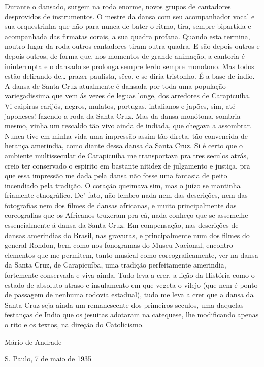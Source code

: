Durante o dansado, surgem na roda enorme, novos grupos de cantadores
desprovidos de instrumentos. O mestre da dansa com seu acompanhador
vocal e sua orquestrinha que não para nunca de bater o ritmo, tira,
sempre bipartida e acompanhada das firmatas corais, a sua quadra
profana. Quando esta termina, noutro lugar da roda outros cantadores
tiram outra quadra. E são depois outros e depois outros, de forma que,
nos momentos de grande animação, a cantoria é ininterrupta e o dansado
se prolonga sempre lerdo sempre monotono. Mas todos estão delirando
de\ldots{} prazer paulista, sêco, e se diria tristonho. É a base de indio. A
dansa de Santa Cruz atualmente é dansada por toda uma população
variegadissima que vem ás vezes de leguas longe, dos arredores de
Carapicuíba. Vi caipiras carijós, negros, mulatos, portugas, intalianos
e japões, sim, até japoneses! fazendo a roda da Santa Cruz. Mas da dansa
monótona, sombria mesmo, vinha um rescaldo tão vivo ainda de indiada,
que chegava a assombrar. Nunca tive em minha vida uma impressão assim
tão direta, tão convencida de herança amerindia, como diante dessa dansa
da Santa Cruz. Si é certo que o ambiente multissecular de Carapicuíba me
transportava pra tres seculos atrás, creio ter conservado o espirito em
bastante nitidez de julgamento e justiça, pra que essa impressão me dada
pela dansa não fosse uma fantasia de peito incendiado pela tradição. O
coração queimava sim, mas o juízo se mantinha friamente etnográfico.
De"-fato, não lembro nada nem das descrições, nem das fotografias nem dos
filmes de dansas africanas, e muito principalmente das coreografias que
os Africanos truxeram pra cá, nada conheço que se assemelhe
essencialmente á dansa da Santa Cruz. Em compensação, nas descrições de
dansas amerindias do Brasil, nas gravuras, e principalmente num dos
filmes do general Rondon, bem como nos fonogramas do Museu Nacional,
encontro elementos que me permitem, tanto musical como
coreograficamente, ver na dansa da Santa Cruz, de Carapicuíba, uma
tradição perfeitamente amerindia, fortemente conservada e viva ainda.
Tudo leva a crer, a lição da História como o estado de absoluto atraso e
insulamento em que vegeta o vilejo (que nem é ponto de passagem de
nenhuma rodovia estadual), tudo me leva a crer que a dansa da Santa Cruz
seja ainda um remanescente dos primeiros seculos, uma daquelas festanças
de Indio que os jesuitas adotaram na catequese, lhe modificando apenas o
rito e os textos, na direção do Catolicismo.

\begin{flushright}
\vfill
Mário de Andrade

S. Paulo, 7 de maio de 1935
\end{flushright}


